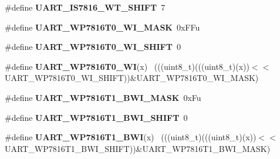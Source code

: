 \begin{DoxyCompactItemize}
\item 
\hypertarget{group___u_a_r_t___register___masks_ga4d7a1e1c191f1d8114ccef43b758ebfd}{}\#define {\bfseries U\+A\+R\+T\+\_\+\+I\+S7816\+\_\+\+W\+T\+\_\+\+S\+H\+I\+F\+T}~7\label{group___u_a_r_t___register___masks_ga4d7a1e1c191f1d8114ccef43b758ebfd}

\item 
\hypertarget{group___u_a_r_t___register___masks_ga0a582c1c952e184c6d89be1827e3c131}{}\#define {\bfseries U\+A\+R\+T\+\_\+\+W\+P7816\+T0\+\_\+\+W\+I\+\_\+\+M\+A\+S\+K}~0x\+F\+Fu\label{group___u_a_r_t___register___masks_ga0a582c1c952e184c6d89be1827e3c131}

\item 
\hypertarget{group___u_a_r_t___register___masks_gad25ad450ca4c9d163a598ad6781ac8d8}{}\#define {\bfseries U\+A\+R\+T\+\_\+\+W\+P7816\+T0\+\_\+\+W\+I\+\_\+\+S\+H\+I\+F\+T}~0\label{group___u_a_r_t___register___masks_gad25ad450ca4c9d163a598ad6781ac8d8}

\item 
\hypertarget{group___u_a_r_t___register___masks_gaeaaec7ed7724d83dc28f6b1e4681ca16}{}\#define {\bfseries U\+A\+R\+T\+\_\+\+W\+P7816\+T0\+\_\+\+W\+I}(x)                                        ~(((uint8\+\_\+t)(((uint8\+\_\+t)(x))$<$$<$U\+A\+R\+T\+\_\+\+W\+P7816\+T0\+\_\+\+W\+I\+\_\+\+S\+H\+I\+F\+T))\&U\+A\+R\+T\+\_\+\+W\+P7816\+T0\+\_\+\+W\+I\+\_\+\+M\+A\+S\+K)\label{group___u_a_r_t___register___masks_gaeaaec7ed7724d83dc28f6b1e4681ca16}

\item 
\hypertarget{group___u_a_r_t___register___masks_ga9b252b9dd4381388279f30adc107d715}{}\#define {\bfseries U\+A\+R\+T\+\_\+\+W\+P7816\+T1\+\_\+\+B\+W\+I\+\_\+\+M\+A\+S\+K}~0x\+Fu\label{group___u_a_r_t___register___masks_ga9b252b9dd4381388279f30adc107d715}

\item 
\hypertarget{group___u_a_r_t___register___masks_ga111a16bd25727769c150f337dfbb8da1}{}\#define {\bfseries U\+A\+R\+T\+\_\+\+W\+P7816\+T1\+\_\+\+B\+W\+I\+\_\+\+S\+H\+I\+F\+T}~0\label{group___u_a_r_t___register___masks_ga111a16bd25727769c150f337dfbb8da1}

\item 
\hypertarget{group___u_a_r_t___register___masks_ga1c6631632a1edc6a71c3777fb4549afe}{}\#define {\bfseries U\+A\+R\+T\+\_\+\+W\+P7816\+T1\+\_\+\+B\+W\+I}(x)                                      ~(((uint8\+\_\+t)(((uint8\+\_\+t)(x))$<$$<$U\+A\+R\+T\+\_\+\+W\+P7816\+T1\+\_\+\+B\+W\+I\+\_\+\+S\+H\+I\+F\+T))\&U\+A\+R\+T\+\_\+\+W\+P7816\+T1\+\_\+\+B\+W\+I\+\_\+\+M\+A\+S\+K)\label{group___u_a_r_t___register___masks_ga1c6631632a1edc6a71c3777fb4549afe}


\end{DoxyCompactItemize}
